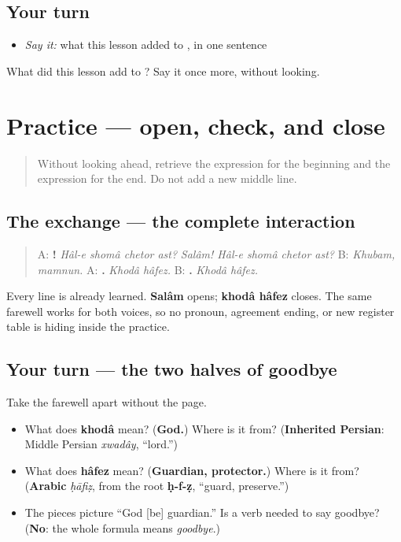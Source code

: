\subsection*{Your turn}
\begin{itemize}
\raggedright
  \item \emph{Say it:} what this lesson added to \textbf{}, in one sentence
\end{itemize}

\begin{tcolorbox}[breakable,colback=teal!4,colframe=teal!35!black,title={Before you move on}]
What did this lesson add to \textbf{}? Say it once more, without looking.
\end{tcolorbox}
\section[Practice]{Practice — open, check, and close}

\label{lesson:FA-C05-practice}



\begin{quote}
Without looking ahead, retrieve the expression for the beginning and the expression for the end. Do not add a new middle line.
\end{quote}

\subsection*{The exchange — the complete interaction}
\begin{quote}
A: \textbf{!} \emph{Hâl-e shomâ chetor ast?} \emph{Salâm! Hâl-e shomâ chetor ast?} B: \emph{Khubam, mamnun.} A: \textbf{.} \emph{Khodâ hâfez.} B: \textbf{.} \emph{Khodâ hâfez.}
\end{quote}

Every line is already learned. \textbf{Salâm} opens; \textbf{khodâ hâfez} closes. The same farewell works for both voices, so no pronoun, agreement ending, or new register table is hiding inside the practice.

\subsection*{Your turn — the two halves of goodbye}
Take the farewell apart without the page.

\begin{itemize}
\raggedright
  \item What does \textbf{khodâ} mean? (\textbf{God.}) Where is it from? (\textbf{Inherited Persian}: Middle Persian \emph{xwadây}, \textquotedblleft{}lord.\textquotedblright{})
  \item What does \textbf{hâfez} mean? (\textbf{Guardian, protector.}) Where is it from? (\textbf{Arabic} \emph{ḥāfiẓ}, from the root \textbf{ḥ-f-ẓ}, \textquotedblleft{}guard, preserve.\textquotedblright{})
  \item The pieces picture \textquotedblleft{}God {[}be{]} guardian.\textquotedblright{} Is a verb needed to say goodbye? (\textbf{No}: the whole formula means \emph{goodbye}.)
\end{itemize}

